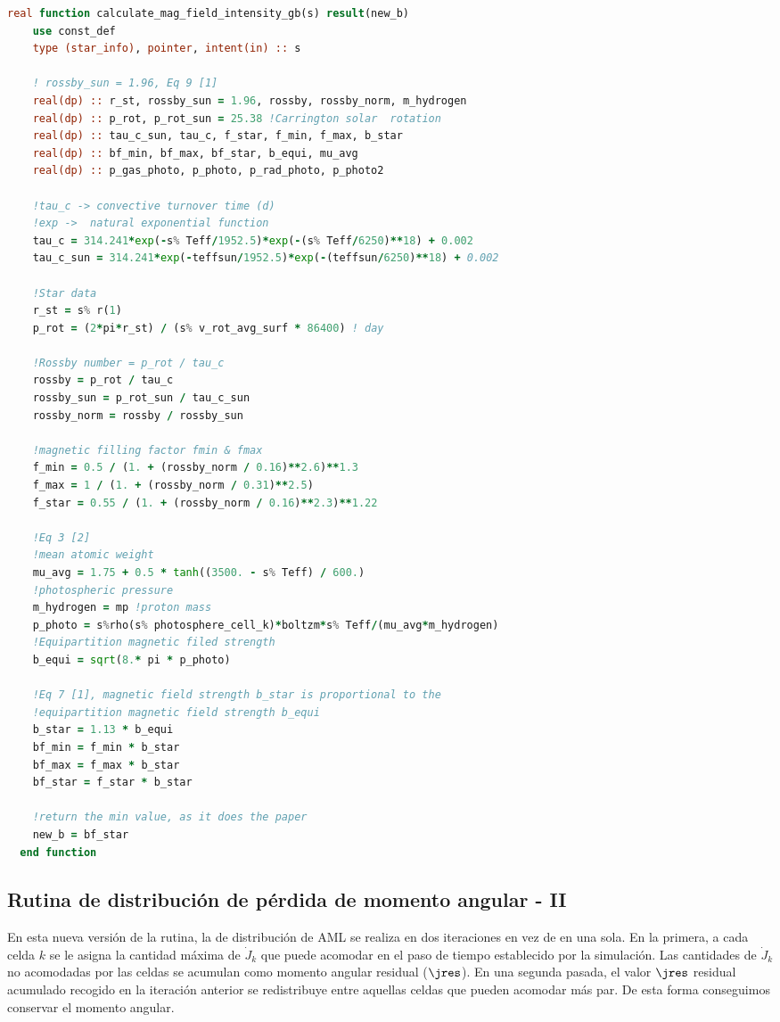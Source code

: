 \begin{lstlisting}[language=Fortran, float, caption={Rutina de cálculo de intensidad de campo magnético.}, label={lst:jdot_mf_intensity}]
  real function calculate_mag_field_intensity_gb(s) result(new_b)
    use const_def
    type (star_info), pointer, intent(in) :: s
    
    ! rossby_sun = 1.96, Eq 9 [1]
    real(dp) :: r_st, rossby_sun = 1.96, rossby, rossby_norm, m_hydrogen
    real(dp) :: p_rot, p_rot_sun = 25.38 !Carrington solar  rotation
    real(dp) :: tau_c_sun, tau_c, f_star, f_min, f_max, b_star
    real(dp) :: bf_min, bf_max, bf_star, b_equi, mu_avg
    real(dp) :: p_gas_photo, p_photo, p_rad_photo, p_photo2
    
    !tau_c -> convective turnover time (d)
    !exp ->  natural exponential function
    tau_c = 314.241*exp(-s% Teff/1952.5)*exp(-(s% Teff/6250)**18) + 0.002 
    tau_c_sun = 314.241*exp(-teffsun/1952.5)*exp(-(teffsun/6250)**18) + 0.002
    
    !Star data
    r_st = s% r(1)
    p_rot = (2*pi*r_st) / (s% v_rot_avg_surf * 86400) ! day
    
    !Rossby number = p_rot / tau_c
    rossby = p_rot / tau_c
    rossby_sun = p_rot_sun / tau_c_sun
    rossby_norm = rossby / rossby_sun
    
    !magnetic filling factor fmin & fmax
    f_min = 0.5 / (1. + (rossby_norm / 0.16)**2.6)**1.3 
    f_max = 1 / (1. + (rossby_norm / 0.31)**2.5)
    f_star = 0.55 / (1. + (rossby_norm / 0.16)**2.3)**1.22
    
    !Eq 3 [2]
    !mean atomic weight
    mu_avg = 1.75 + 0.5 * tanh((3500. - s% Teff) / 600.)
    !photospheric pressure 
    m_hydrogen = mp !proton mass
    p_photo = s%rho(s% photosphere_cell_k)*boltzm*s% Teff/(mu_avg*m_hydrogen)
    !Equipartition magnetic filed strength
    b_equi = sqrt(8.* pi * p_photo)
    
    !Eq 7 [1], magnetic field strength b_star is proportional to the
    !equipartition magnetic field strength b_equi
    b_star = 1.13 * b_equi
    bf_min = f_min * b_star
    bf_max = f_max * b_star
    bf_star = f_star * b_star
    
    !return the min value, as it does the paper
    new_b = bf_star
  end function	
\end{lstlisting}

\subsection{Rutina de distribución de pérdida de momento angular - II} \label{sec:dist_aml2}
En esta nueva versión de la rutina, la de distribución de AML se realiza en dos iteraciones en vez de en una sola. En la primera, a cada celda $k$ se le asigna la cantidad máxima de $\Dot{J}_{k}$ que puede acomodar en el paso de tiempo establecido por la simulación. Las cantidades de $\Dot{J}_{k}$ no acomodadas por las celdas se acumulan como momento angular residual ($\jres$). En una segunda pasada, el valor $\jres$ residual acumulado recogido en la iteración anterior se redistribuye entre aquellas celdas que pueden acomodar más par. De esta forma conseguimos conservar el momento angular.\par 

